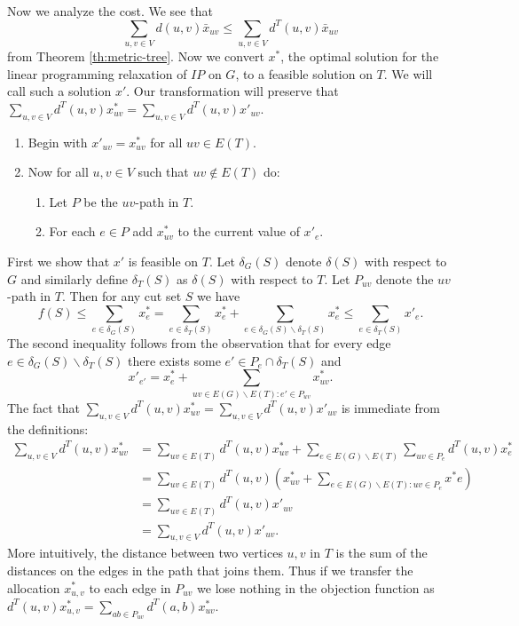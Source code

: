 \documentclass[letterpaper,12pt,oneside,onecolumn]{article}
\begin{document}
\paragraph{}
Now we analyze the cost. We see that
$$\sum_{u,v \in V} d(u,v) \bar{x}_{uv} \leq \sum_{u,v \in V} d^T(u,v) \bar{x}_{uv}$$
from Theorem \ref{th:metric-tree}. Now we convert $x^*$, the optimal solution for the linear programming relaxation of $IP$ on $G$, to a feasible solution on $T$. We will call such a solution $x'$. Our transformation will  preserve that $\sum_{u,v \in V} d^T(u,v) x^*_{uv} = \sum_{u,v \in V} d^T(u,v) x'_{uv}$. 
\begin{enumerate}
\item Begin with $x'_{uv} = x^*_{uv}$ for all $uv \in E(T)$.
\item Now for all $u,v \in V$ such that $uv \not\in E(T)$ do:
\begin{enumerate}
\item Let $P$ be the $uv$-path in $T$.
\item For each $e \in P$ add $x^*_{uv}$ to the current value of $x'_e$.
\end{enumerate}
\end{enumerate}
First we show that $x'$ is feasible on $T$. Let $\delta_G(S)$ denote $\delta(S)$ with respect to $G$ and similarly define $\delta_T(S)$ as $\delta(S)$ with respect to $T$. Let $P_{uv}$ denote the $uv$-path in $T$. Then for any cut set $S$ we have
$$f(S) \leq \sum_{e \in \delta_G(S)} x^*_e = \sum_{e\in \delta_T(S)} x^*_e + \sum_{e \in \delta_G(S)\backslash \delta_T(S)} x^*_e \leq \sum_{e \in \delta_T(S)} x'_e.$$
The second inequality follows from the observation that for every edge $e \in \delta_G(S) \backslash \delta_T(S)$ there exists some $e' \in P_{e} \cap \delta_T(S)$ and $$x'_{e'} = x^*_e + \sum_{uv \in E(G) \backslash E(T) : e' \in P_{uv}} x^*_{uv}.$$
The fact that $\sum_{u,v \in V} d^T(u,v) x^*_{uv} = \sum_{u,v \in V} d^T(u,v) x'_{uv}$ is immediate from the definitions:
\begin{align*}
\sum_{u,v \in V} d^T(u,v) x^*_{uv} &= \sum_{uv \in E(T)} d^T(u,v)x^*_{uv} + \sum_{e \in E(G) \backslash E(T)} \sum_{uv \in P_{e}} d^T(u,v) x^*_{e}\\
&= \sum_{uv \in E(T)} d^T(u,v)( x^*_{uv} + \sum_{e \in E(G)\backslash E(T): uv \in P_{e}} x^*{e}) \\
&= \sum_{uv \in E(T)} d^T(u,v) x'_{uv} \\
&= \sum_{u,v \in V} d^T(u,v) x'_{uv}.
\end{align*}
More intuitively, the distance between two vertices $u,v$ in $T$ is the sum of the distances on the edges in the path that joins them. Thus if we transfer the allocation $x^*_{u,v}$ to each edge in $P_{uv}$ we lose nothing in the objection function as $d^T(u,v) x^*_{u,v} = \sum_{ab \in P_{uv}} d^T(a,b) x^*_{uv}$.
\end{document}
